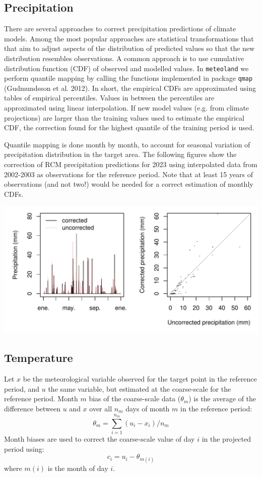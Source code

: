 \documentclass[11pt,a4paper]{article}
\begin{document}
\subsection{Precipitation}
There are several approaches to correct precipitation predictions of climate models. Among the most popular approaches are statistical transformations that that aim to adjust aspects of the distribution of predicted values so that the new distribution resembles observations. A common approach is to use cumulative distribution function (CDF) of observed and modelled values. In \texttt{meteoland} we perform quantile mapping by calling the functions implemented in package \texttt{qmap} (Gudmundsson et al. 2012). In short, the empirical CDFs are approximated using tables of empirical percentiles. Values in between the percentiles are approximated using linear interpolation. If new model values (e.g. from climate projections) are larger than the training values used to estimate the empirical CDF, the correction found for the highest quantile of the training period is used. 

Quantile mapping is done month by month, to account for seasonal variation of precipitation distribution in the target area. The following figures show the correction of RCM precipitation predictions for 2023 using interpolated data from 2002-2003 as observations for the reference period. Note that at least 15 years of observations (and not two!) would be needed for a correct estimation of monthly CDFs.
\begin{center}
\includegraphics{Meteorology-019}
\end{center}
\subsection{Temperature}
Let $x$ be the meteorological variable observed for the target point in the reference period, and $u$ the same variable, but estimated at the coarse-scale for the reference period. Month $m$ bias of the coarse-scale data ($\theta_{m}$) is the average of the difference between $u$ and $x$ over all $n_m$ days of month $m$ in the reference period:
\begin{equation}
\theta_{m} = \sum_{i=1}^{n_m}{(u_i-x_i)}/n_m
\end{equation}
Month biases are used to correct the coarse-scale value of day $i$ in the projected period using:
\begin{equation}
c_i = u_i - \theta_{m(i)}
\end{equation}
where $m(i)$ is the month of day $i$.
\end{document}
